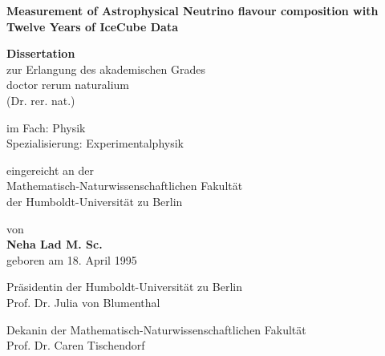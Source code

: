 \thispagestyle{plain}
\begin{center}
	\vspace*{1cm}

	\LARGE
	\textbf{Measurement of  Astrophysical Neutrino flavour composition with Twelve Years of IceCube Data}
	\large

	\vspace{0.8cm}

	\textbf{Dissertation}\\
	zur Erlangung des akademischen Grades\\
	doctor rerum naturalium \\
	(Dr. rer. nat.) \\

	\vspace{0.5cm}

	im Fach: Physik \\
	Spezialisierung: Experimentalphysik\\

	\vspace{0.5cm}

	eingereicht an der \\
	Mathematisch-Naturwissenschaftlichen Fakultät\\
	der Humboldt-Universität zu Berlin\\

	\vspace{0.5cm}

	von\\
	\textbf{Neha Lad M. Sc.}\\
	geboren am 18. April 1995\\
	

	\vspace{0.5cm}

	Präsidentin der Humboldt-Universität zu Berlin \\
	Prof. Dr. Julia von Blumenthal \\

	\vspace{0.5cm}

	Dekanin der Mathematisch-Naturwissenschaftlichen Fakultät \\
	Prof. Dr. Caren Tischendorf \\

	\vspace{0.5cm}




\end{center}


